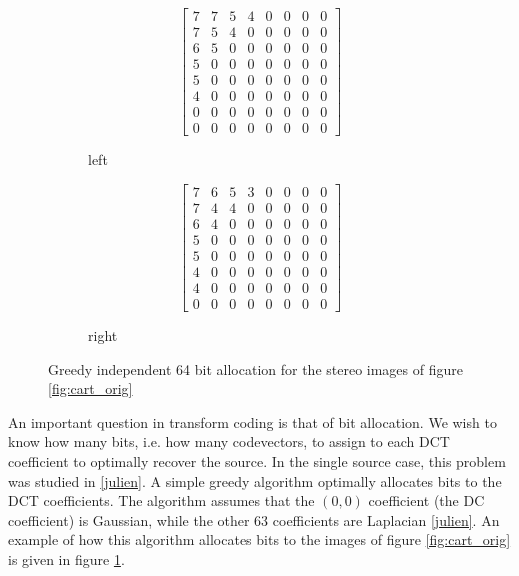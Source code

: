 \documentclass[10pt]{article}
\begin{document}
\begin{figure}
    \begin{subfigure}{0.5\textwidth}
        \begin{equation*}
            \left[
            \begin{matrix}
                7 & 7 & 5 & 4 & 0 & 0 & 0 & 0 \\
                7 & 5 & 4 & 0 & 0 & 0 & 0 & 0 \\
                6 & 5 & 0 & 0 & 0 & 0 & 0 & 0 \\
                5 & 0 & 0 & 0 & 0 & 0 & 0 & 0 \\
                5 & 0 & 0 & 0 & 0 & 0 & 0 & 0 \\
                4 & 0 & 0 & 0 & 0 & 0 & 0 & 0 \\
                0 & 0 & 0 & 0 & 0 & 0 & 0 & 0 \\
                0 & 0 & 0 & 0 & 0 & 0 & 0 & 0
            \end{matrix}
            \right]
        \end{equation*}
    \caption{left}
    \end{subfigure}%
    \begin{subfigure}{0.5\textwidth}
        \begin{equation*}
            \left[
            \begin{matrix}
                7 & 6 & 5 & 3 & 0 & 0 & 0 & 0 \\
                7 & 4 & 4 & 0 & 0 & 0 & 0 & 0 \\
                6 & 4 & 0 & 0 & 0 & 0 & 0 & 0 \\
                5 & 0 & 0 & 0 & 0 & 0 & 0 & 0 \\
                5 & 0 & 0 & 0 & 0 & 0 & 0 & 0 \\
                4 & 0 & 0 & 0 & 0 & 0 & 0 & 0 \\
                4 & 0 & 0 & 0 & 0 & 0 & 0 & 0 \\
                0 & 0 & 0 & 0 & 0 & 0 & 0 & 0
            \end{matrix}
            \right]
        \end{equation*}
    \caption{right}
    \end{subfigure}
    \caption{Greedy independent 64 bit allocation for the stereo images of figure \ref{fig:cart_orig} }
    \label{fig:cart_bit_alloc}
\end{figure}

An important question in transform coding is that of bit allocation. We wish to know how many bits, i.e. how many codevectors, to assign to each DCT coefficient to optimally recover the source. In the single source case, this problem was studied in \ref{julien}. A simple greedy algorithm optimally allocates bits to the DCT coefficients. The algorithm assumes that the $(0,0)$ coefficient (the DC coefficient) is Gaussian, while the other 63 coefficients are Laplacian \ref{julien}. An example of how this algorithm allocates bits to the images of figure \ref{fig:cart_orig} is given in figure \ref{fig:cart_bit_alloc}.\\
\end{document}
